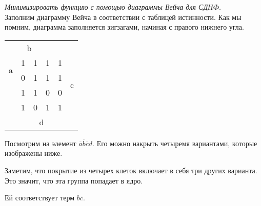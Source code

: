 \documentclass[a4paper,12pt]{article}
\begin{document}
\textit{Минимизировать функцию с помощью диаграммы Вейча для СДНФ.}\\

Заполним диаграмму Вейча в соответствии с таблицей истинности.
Как мы помним, диаграмма заполняется зигзагами, начиная с правого нижнего угла.

\begin{center}
\begin{tabular}{c *{4}{|c}| c}
 &  \\ 
 & 1 & 1 & 1 & 1 \\ 
& 0 & 1 & 1 & 1 &  \\ 
& 1 & 1 & 0 & 0 \\ 
& 1 & 0 & 1 & 1 \\ 
 & 
\end{tabular}
\end{center}


Посмотрим на элемент $\overline{a}\overline{b}\overline{c}d$.
Его можно накрыть четыремя вариантами, которые изображены ниже.

Заметим, что покрытие из четырех клеток включает в себя три других варианта.
Это значит, что эта группа попадает в ядро.

Ей соответствует терм $\overline{b}\overline{c}$.
\end{document}
